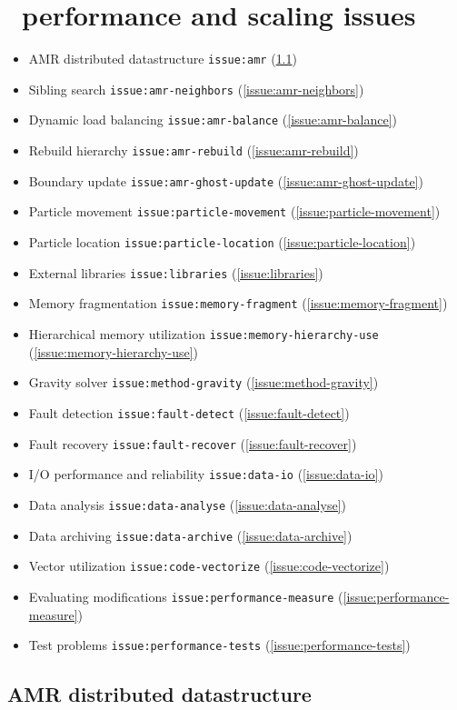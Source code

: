 \documentclass{article}
\begin{document}

\section{\enzo\ performance and scaling issues}

\newcommand{\REF}[1]{\texttt{#1} (\ref{#1})}
\begin{itemize}
\item AMR distributed datastructure \REF{issue:amr}
\item Sibling search \REF{issue:amr-neighbors}
\item Dynamic load balancing \REF{issue:amr-balance}
\item Rebuild hierarchy \REF{issue:amr-rebuild}
\item Boundary update \REF{issue:amr-ghost-update}
\item Particle movement \REF{issue:particle-movement}
\item Particle location \REF{issue:particle-location}
\item External libraries \REF{issue:libraries}
\item Memory fragmentation \REF{issue:memory-fragment}
\item Hierarchical memory utilization \REF{issue:memory-hierarchy-use}
\item Gravity solver \REF{issue:method-gravity}
\item Fault detection \REF{issue:fault-detect}
\item Fault recovery \REF{issue:fault-recover}
\item I/O performance and reliability \REF{issue:data-io}
\item Data analysis \REF{issue:data-analyse}
\item Data archiving \REF{issue:data-archive}
\item Vector utilization \REF{issue:code-vectorize}
\item Evaluating modifications \REF{issue:performance-measure}
\item Test problems \REF{issue:performance-tests}
\end{itemize}

\subsection{AMR distributed datastructure} \label{issue:amr}
\end{document}
